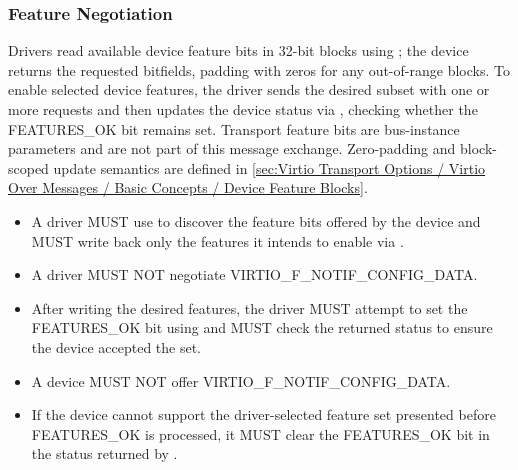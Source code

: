 \subsubsection{Feature Negotiation}
\label{sec:Virtio Transport Options / Virtio Over Messages / Device Initialization / Device Features}

Drivers read available device feature bits in 32-bit blocks using
; the device returns the requested bitfields,
padding with zeros for any out-of-range blocks. To enable selected device
features, the driver sends the desired subset with one or more
 requests and then updates the device status via
, checking whether the FEATURES\_OK bit remains set.
Transport feature bits are bus-instance
parameters and are not part of this message exchange. Zero-padding and
block-scoped update semantics are defined in
\ref{sec:Virtio Transport Options / Virtio Over Messages / Basic Concepts / Device Feature Blocks}.

\begin{itemize}
  \item A driver MUST use  to discover the feature
        bits offered by the device and MUST write back only the features it
        intends to enable via .
  \item A driver MUST NOT negotiate VIRTIO\_F\_NOTIF\_CONFIG\_DATA.
  \item After writing the desired features, the driver MUST attempt to set the
        FEATURES\_OK bit using  and MUST check the
        returned status to ensure the device accepted the set.
\end{itemize}

\begin{itemize}
  \item A device MUST NOT offer VIRTIO\_F\_NOTIF\_CONFIG\_DATA.
  \item If the device cannot support the driver-selected feature set presented
        before FEATURES\_OK is processed, it MUST clear the FEATURES\_OK bit in
        the status returned by .
\end{itemize}

